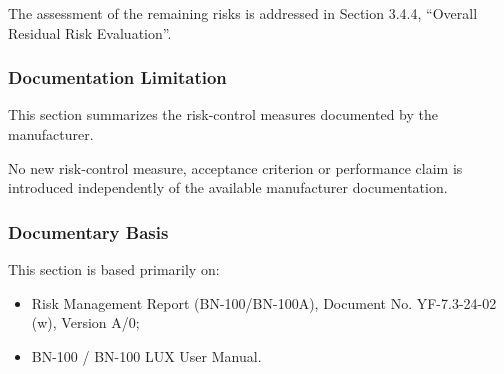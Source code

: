 The assessment of the remaining risks is addressed in Section 3.4.4,
``Overall Residual Risk Evaluation''.

\subsubsection{Documentation Limitation}

This section summarizes the risk-control measures documented by the
manufacturer.

No new risk-control measure, acceptance criterion or performance claim is
introduced independently of the available manufacturer documentation.

\subsubsection{Documentary Basis}

This section is based primarily on:

\begin{itemize}

    \item Risk Management Report (BN-100/BN-100A), Document No.
    YF-7.3-24-02 (w), Version A/0;

    \item BN-100 / BN-100 LUX User Manual.

\end{itemize}
